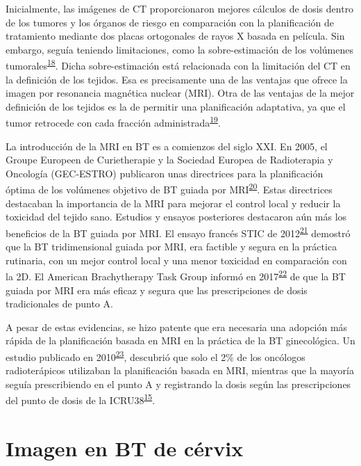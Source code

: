 \documentclass[
  a4paper,
]{scrreprt}
\begin{document}
Inicialmente, las imágenes de CT proporcionaron mejores cálculos de
dosis dentro de los tumores y los órganos de riesgo en comparación con
la planificación de tratamiento mediante dos placas ortogonales de rayos
X basada en película. Sin embargo, seguía teniendo limitaciones, como la
sobre-estimación de los volúmenes
tumorales\textsuperscript{\protect\hyperlink{ref-onal2009a}{18}}. Dicha
sobre-estimación está relacionada con la limitación del CT en la
definición de los tejidos. Esa es precisamente una de las ventajas que
ofrece la imagen por resonancia magnética nuclear (MRI). Otra de las
ventajas de la mejor definición de los tejidos es la de permitir una
planificación adaptativa, ya que el tumor retrocede con cada fracción
administrada\textsuperscript{\protect\hyperlink{ref-sagae2023}{19}}.

La introducción de la MRI en BT es a comienzos del siglo XXI. En 2005,
el Groupe Europeen de Curietherapie y la Sociedad Europea de
Radioterapia y Oncología (GEC-ESTRO) publicaron unas directrices para la
planificación óptima de los volúmenes objetivo de BT guiada por
MRI\textsuperscript{\protect\hyperlink{ref-haie-meder2005}{20}}. Estas
directrices destacaban la importancia de la MRI para mejorar el control
local y reducir la toxicidad del tejido sano. Estudios y ensayos
posteriores destacaron aún más los beneficios de la BT guiada por MRI.
El ensayo francés STIC de
2012\textsuperscript{\protect\hyperlink{ref-charra-brunaud2012}{21}}
demostró que la BT tridimensional guiada por MRI, era factible y segura
en la práctica rutinaria, con un mejor control local y una menor
toxicidad en comparación con la 2D. El American Brachytherapy Task Group
informó en 2017\textsuperscript{\protect\hyperlink{ref-mayadev2017}{22}}
de que la BT guiada por MRI era más eficaz y segura que las
prescripciones de dosis tradicionales de punto A.

A pesar de estas evidencias, se hizo patente que era necesaria una
adopción más rápida de la planificación basada en MRI en la práctica de
la BT ginecológica. Un estudio publicado en
2010\textsuperscript{\protect\hyperlink{ref-viswanathan2010}{23}},
descubrió que solo el 2\% de los oncólogos radioterápicos utilizaban la
planificación basada en MRI, mientras que la mayoría seguía
prescribiendo en el punto A y registrando la dosis según las
prescripciones del punto de dosis de la
ICRU38\textsuperscript{\protect\hyperlink{ref-ICRU38}{15}}.

\hypertarget{imagen-en-bt-de-cuxe9rvix}{%
\section{Imagen en BT de cérvix}\label{imagen-en-bt-de-cuxe9rvix}}
\end{document}
